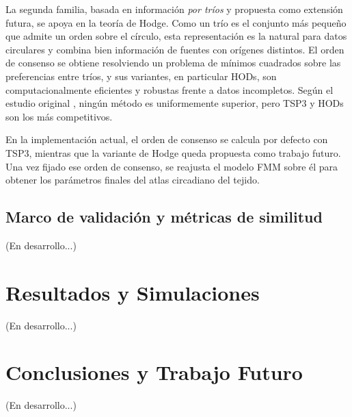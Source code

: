 \documentclass[12pt, a4paper]{report}
\begin{document}
La segunda familia, basada en información \emph{por tríos} y propuesta como extensión futura, se apoya en la teoría de Hodge. Como un trío es el conjunto más pequeño que admite un orden sobre el círculo, esta representación es la natural para datos circulares y combina bien información de fuentes con orígenes distintos. El orden de consenso se obtiene resolviendo un problema de mínimos cuadrados sobre las preferencias entre tríos, y sus variantes, en particular HODs, son computacionalmente eficientes y robustas frente a datos incompletos. Según el estudio original \cite{barragan2015}, ningún método es uniformemente superior, pero TSP3 y HODs son los más competitivos.

En la implementación actual, el orden de consenso se calcula por defecto con TSP3, mientras que la variante de Hodge queda propuesta como trabajo futuro. Una vez fijado ese orden de consenso, se reajusta el modelo FMM sobre él para obtener los parámetros finales del atlas circadiano del tejido.

\section{Marco de validación y métricas de similitud}
\label{sec:validacion}
(En desarrollo...)

\chapter{Resultados y Simulaciones}
(En desarrollo...)

\chapter{Conclusiones y Trabajo Futuro}
(En desarrollo...)
\end{document}
